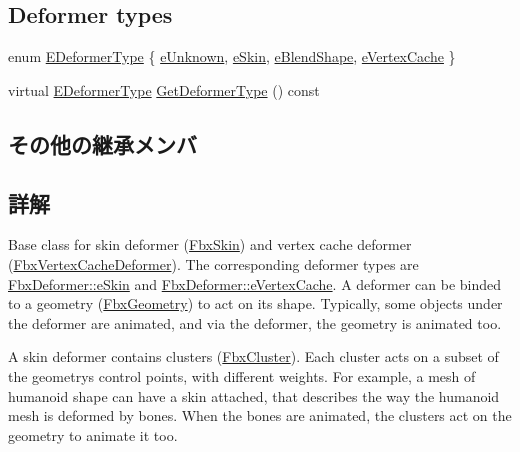 \subsection*{Deformer types}
\begin{DoxyCompactItemize}
\item 
enum \hyperlink{class_fbx_deformer_a07e2cfb767191ba5c8799fdfbfe3eaf6}{E\+Deformer\+Type} \{ \hyperlink{class_fbx_deformer_a07e2cfb767191ba5c8799fdfbfe3eaf6a432666d716eeff4acebb52aeb7df93ee}{e\+Unknown}, 
\hyperlink{class_fbx_deformer_a07e2cfb767191ba5c8799fdfbfe3eaf6ae219b2649e29244fe4d80e649241c90e}{e\+Skin}, 
\hyperlink{class_fbx_deformer_a07e2cfb767191ba5c8799fdfbfe3eaf6aa59f09ee382f2e19e4923b5b2155b2d9}{e\+Blend\+Shape}, 
\hyperlink{class_fbx_deformer_a07e2cfb767191ba5c8799fdfbfe3eaf6afca1c8188109c1fe60004335f76a42b8}{e\+Vertex\+Cache}
 \}
\item 
virtual \hyperlink{class_fbx_deformer_a07e2cfb767191ba5c8799fdfbfe3eaf6}{E\+Deformer\+Type} \hyperlink{class_fbx_deformer_adbc586e383f788f24d7fce9ed859d481}{Get\+Deformer\+Type} () const
\end{DoxyCompactItemize}
\subsection*{その他の継承メンバ}


\subsection{詳解}
Base class for skin deformer (\hyperlink{class_fbx_skin}{Fbx\+Skin}) and vertex cache deformer (\hyperlink{class_fbx_vertex_cache_deformer}{Fbx\+Vertex\+Cache\+Deformer}). The corresponding deformer types are \hyperlink{class_fbx_deformer_a07e2cfb767191ba5c8799fdfbfe3eaf6ae219b2649e29244fe4d80e649241c90e}{Fbx\+Deformer\+::e\+Skin} and \hyperlink{class_fbx_deformer_a07e2cfb767191ba5c8799fdfbfe3eaf6afca1c8188109c1fe60004335f76a42b8}{Fbx\+Deformer\+::e\+Vertex\+Cache}. A deformer can be binded to a geometry (\hyperlink{class_fbx_geometry}{Fbx\+Geometry}) to act on its shape. Typically, some objects under the deformer are animated, and via the deformer, the geometry is animated too.

A skin deformer contains clusters (\hyperlink{class_fbx_cluster}{Fbx\+Cluster}). Each cluster acts on a subset of the geometry\textquotesingle{}s control points, with different weights. For example, a mesh of humanoid shape can have a skin attached, that describes the way the humanoid mesh is deformed by bones. When the bones are animated, the clusters act on the geometry to animate it too.

